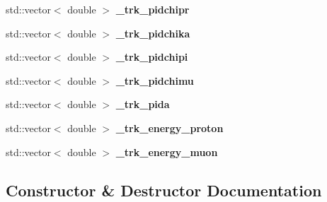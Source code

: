 \begin{DoxyCompactItemize}
\item 
std\+::vector$<$ double $>$ {\bfseries \+\_\+trk\+\_\+pidchipr}\hypertarget{classanalysis_1_1TrackAnalysis_a0020d81b4457b5bfec7ca950631ea75c}{}\label{classanalysis_1_1TrackAnalysis_a0020d81b4457b5bfec7ca950631ea75c}

\item 
std\+::vector$<$ double $>$ {\bfseries \+\_\+trk\+\_\+pidchika}\hypertarget{classanalysis_1_1TrackAnalysis_a6caa78fafa796d4c34dd86b6c4af7762}{}\label{classanalysis_1_1TrackAnalysis_a6caa78fafa796d4c34dd86b6c4af7762}

\item 
std\+::vector$<$ double $>$ {\bfseries \+\_\+trk\+\_\+pidchipi}\hypertarget{classanalysis_1_1TrackAnalysis_af6153beab708b07e2e9111bdfa7ef7bf}{}\label{classanalysis_1_1TrackAnalysis_af6153beab708b07e2e9111bdfa7ef7bf}

\item 
std\+::vector$<$ double $>$ {\bfseries \+\_\+trk\+\_\+pidchimu}\hypertarget{classanalysis_1_1TrackAnalysis_aed79c5679af1c6329feea7a34bda7e74}{}\label{classanalysis_1_1TrackAnalysis_aed79c5679af1c6329feea7a34bda7e74}

\item 
std\+::vector$<$ double $>$ {\bfseries \+\_\+trk\+\_\+pida}\hypertarget{classanalysis_1_1TrackAnalysis_a3fb26136cae5103046d3c8c95413acaf}{}\label{classanalysis_1_1TrackAnalysis_a3fb26136cae5103046d3c8c95413acaf}

\item 
std\+::vector$<$ double $>$ {\bfseries \+\_\+trk\+\_\+energy\+\_\+proton}\hypertarget{classanalysis_1_1TrackAnalysis_a0b140906dcfbc7971ea82bbc26ed4492}{}\label{classanalysis_1_1TrackAnalysis_a0b140906dcfbc7971ea82bbc26ed4492}

\item 
std\+::vector$<$ double $>$ {\bfseries \+\_\+trk\+\_\+energy\+\_\+muon}\hypertarget{classanalysis_1_1TrackAnalysis_a3e410b8e3786b70fbce29c798f20d1ca}{}\label{classanalysis_1_1TrackAnalysis_a3e410b8e3786b70fbce29c798f20d1ca}

\end{DoxyCompactItemize}


\subsection{Constructor \& Destructor Documentation}
